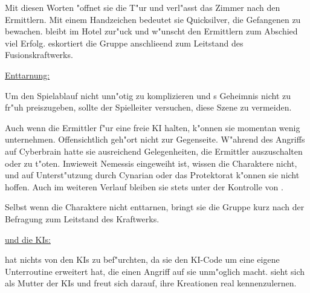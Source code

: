 
Mit diesen Worten "offnet sie die T"ur und verl"asst das Zimmer nach den Ermittlern. Mit einem Handzeichen bedeutet sie Quicksilver, die Gefangenen zu bewachen. \ml{} bleibt im Hotel zur"uck und w"unscht den Ermittlern zum Abschied viel Erfolg. \xl{} eskortiert die Gruppe anschlie\3end zum Leitstand des Fusionskraftwerks.

\begin{remarks}
	\underline{Enttarnung:}

	Um den Spielablauf nicht unn"otig zu komplizieren und \xl{}s Geheimnis nicht zu fr"uh preiszugeben, sollte der Spielleiter versuchen, diese Szene zu vermeiden.

	Auch wenn die Ermittler \xl{} f"ur eine freie KI halten, k"onnen sie momentan wenig unternehmen. Offensichtlich geh"ort \xl{} nicht zur Gegenseite. W"ahrend des Angriffs auf Cyberbrain hatte sie ausreichend Gelegenheiten, die Ermittler auszuschalten oder \ml{} zu t"oten. Inwieweit Nemessis eingeweiht ist, wissen die Charaktere nicht, und auf Unterst"utzung durch Cynarian oder das Protektorat k"onnen sie nicht hoffen. Auch im weiteren Verlauf bleiben sie stets unter der Kontrolle von \xl{}.
	
	Selbst wenn die Charaktere \xl{} nicht enttarnen, bringt sie die Gruppe kurz nach der Befragung zum Leitstand des Kraftwerks.

	\underline{\ml{} und die KIs:}

	\ml{} hat nichts von den KIs zu bef"urchten, da sie den KI-Code um eine eigene Unterroutine erweitert hat, die einen Angriff auf sie unm"oglich macht. \ml{} sieht sich als Mutter der KIs und freut sich darauf, ihre Kreationen real kennenzulernen.
\end{remarks}
